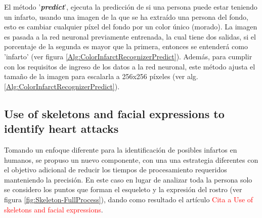         El método '\textbf{\textit{predict}}', ejecuta la predicción de si una persona puede estar teniendo un infarto, usando una imagen de la que se ha extraído una persona del fondo, esto es cambiar cualquier píxel del fondo por un color único (morado). La imagen es pasada a la red neuronal previamente entrenada, la cual tiene dos salidas, si el porcentaje de la segunda es mayor que la primera, entonces se entenderá como 'infarto' (ver figura \ref{Alg:ColorInfarctRecognizerPredict}). Además, para cumplir con los requisitos de ingreso de los datos a la red neuronal, este método ajusta el tamaño de la imagen para escalarla a 256x256 píxeles (ver alg. \ref{Alg:ColorInfarctRecognizerPredict}).
                
        
    
    \subsection{Use of skeletons and facial expressions to identify heart attacks}
    \label{sub:InfarctSkeletonMethod}
        Tomando un enfoque diferente para la identificación de posibles infartos en humanos, se propuso un nuevo componente, con una una estrategia diferentes con el objetivo adicional de reducir los tiempos de procesamiento requeridos manteniendo la precisión. En este caso en lugar de analizar toda la persona solo se considero los puntos que forman el esqueleto y la expresión del rostro (ver figura \ref{fig:Skeleton-FullProcess}), dando como resultado el artículo \textcolor{red}{Cita a Use of skeletons and facial expressions}.
        
